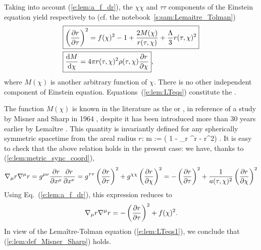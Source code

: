 Taking into account (\ref{e:lem:a_f_dr}), the $\chi\chi$ and $\tau\tau$ components of the Einstein equation
yield respectively to (cf. the notebook~\ref{s:sam:Lemaitre_Tolman})
\begin{subequations}\label{e:lem:LTeqs}
\begin{align}
 & \fbox{$\displaystyle \left( \frac{\partial r}{\partial \tau} \right) ^2 = f(\chi)^2 - 1 + \frac{2M(\chi)}{r(\tau,\chi)}
   + \frac{\Lambda}{3} r(\tau,\chi)^2 $} \label{e:lem:LTeqs1} \\
 & \fbox{$\displaystyle \frac{\mathrm{d} M}{\mathrm{d}\chi} = 4\pi r(\tau,\chi)^2 \rho(\tau,\chi) \frac{\partial r}{\partial \chi} $} ,
    \label{e:lem:LTeqs2}
 \end{align}
\end{subequations}
where $M(\chi)$ is another arbitrary function of $\chi$.
There is no other independent component of Einstein equation.
Equations~(\ref{e:lem:LTeqs}) constitute the
.

The function $M(\chi)$ is known in the literature as the  or , in reference
of a study by Misner and Sharp in 1964 \cite{MisneS64}, despite it has been introduced
more than 30 years earlier by Lemaître \cite{Lemai32}. This quantity is
invariantly defined for any spherically symmetric spacetime from the areal radius $r$:
\be \label{e:lem:def_Misner_Sharp}
    m  :=  \left( 1 - \nabla_\mu r \nabla^\mu r  -  r^2\right) .
\ee
It is easy to check that the above relation holds in the present case:
we have, thanks to (\ref{e:lem:metric_sync_coord}),
\[
    \nabla_\mu r \nabla^\mu r = g^{\mu\nu} \frac{\partial r}{\partial x^\mu} \frac{\partial r}{\partial x^\nu}
        = g^{\tau\tau} \left( \frac{\partial r}{\partial \tau} \right)^2
        + g^{\chi\chi} \left( \frac{\partial r}{\partial \chi} \right)^2
        = - \left( \frac{\partial r}{\partial \tau} \right)^2 + \frac{1}{a(\tau,\chi)^2} \left( \frac{\partial r}{\partial \chi} \right)^2
\]
Using Eq.~(\ref{e:lem:a_f_dr}), this expression reduces to
\[
    \nabla_\mu r \nabla^\mu r = - \left( \frac{\partial r}{\partial \tau} \right)^2 + f(\chi)^2 .
\]
In view of the Lemaître-Tolman equation (\ref{e:lem:LTeqs1}), we conclude that
(\ref{e:lem:def_Misner_Sharp}) holds.

